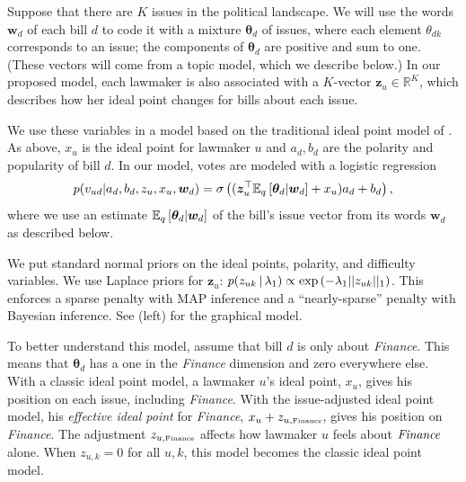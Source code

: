 Suppose that there are $K$ issues in the political landscape.  We will
use the words $\bm w_d$ of each bill $d$ to code it with a mixture
$\bm \theta_d$ of issues, where each element $\theta_{dk}$
corresponds to an issue; the components of $\bm \theta_d$ are positive
and sum to one. (These vectors will come from a topic model, which we
describe below.)  In our proposed model, each lawmaker is also
associated with a $K$-vector $\bm z_u \in \mathbb{R}^K$, which
describes how her ideal point changes for bills about each issue.


We use these variables in a model based on the traditional ideal point
model of . As above, $x_u$ is the ideal
point for lawmaker $u$ and $a_d, b_d$ are the polarity and popularity
of bill $d$. In our model, votes are modeled with a logistic
regression
\begin{equation}
  \label{eq:exploratory_ipm_old}
  p(v_{ud} | a_d, b_d, z_u, x_u, \bm w_d) =
  \sigma \left( ( \bm z_u^\top \mathbb{E}_q\left[\bm \theta_d | \bm w_d\right] + x_u ) a_d + b_d \right),
\end{equation}
where we use an estimate $\mathbb{E}_q\left[\bm \theta_d | \bm w_d\right]$ of the
bill's issue vector from its words $\bm w_d$ as described below.

We put standard normal priors on the ideal points, polarity, and
difficulty variables.  We use Laplace priors for $\bm z_{u}$:
$p(z_{uk} \, | \, \lambda_1) \propto \exp\left( - \lambda_1 || z_{uk} ||_1
\right)$.  This enforces a sparse penalty with MAP inference and a
``nearly-sparse'' penalty with Bayesian inference. See
 (left) for the graphical model.

To better understand this model, assume that bill $d$ is only about
\emph{Finance}.  This means that $\bm \theta_d$ has a one in the
\emph{Finance} dimension and zero everywhere else.  With a classic
ideal point model, a lawmaker $u$'s ideal point, $x_u$, gives his
position on each issue, including \emph{Finance}.  With the
issue-adjusted ideal point model, his \emph{effective ideal point} for
\emph{ Finance}, $x_u + z_{u,\mbox{\tiny Finance}}$, gives his
position on \emph{Finance}.  The adjustment $z_{u, \mbox{\tiny
    Finance}}$ affects how lawmaker $u$ feels about $\emph{Finance}$
alone. When $z_{u,k}=0$ for all $u,k$, this model becomes the classic
ideal point model.

